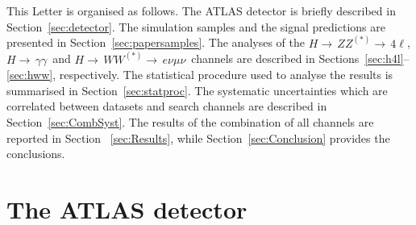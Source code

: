 \documentclass[final,3p,times,twocolumn]{elsarticle}
\newcommand{\hgg}{\ensuremath{H{\rightarrow\,}\gamma\gamma}}
\newcommand{\hWWenmun}{\ensuremath{H{\rightarrow\,}WW^{(*)}{\rightarrow\,}e\nu\mu\nu}}
\newcommand{\hZZllll}{\ensuremath{H{\rightarrow\,}ZZ^{(*)}{\rightarrow\,}4\ell}}
\begin{document}
This Letter is organised as follows.
The ATLAS detector is briefly described in Section~\ref{sec:detector}. 
The simulation samples and the signal predictions are presented in
Section~\ref{sec:papersamples}.
The analyses of the \hZZllll, \hgg\
and \hWWenmun\ channels are described in Sections~\ref{sec:h4l}--\ref{sec:hww}, 
respectively.  The statistical procedure used to
analyse the results is summarised in Section~\ref{sec:statproc}. The systematic uncertainties
which are correlated between datasets and search channels are described in Section~\ref{sec:CombSyst}.
The results of the combination of all channels are reported in Section ~\ref{sec:Results},
while Section~\ref{sec:Conclusion} provides the conclusions.
 
\section{The ATLAS detector\label{sec:detector}}
\end{document}
